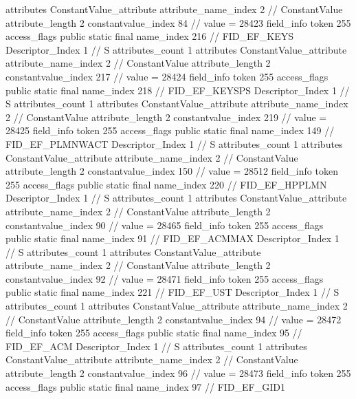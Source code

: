 {{{{{				attributes {
				ConstantValue_attribute {
					attribute_name_index	2		// ConstantValue
					attribute_length	2
					constantvalue_index	84		// value = 28423
				}
				}
			}
			field_info {
				token	255
				access_flags	public static final
				name_index	216		// FID_EF_KEYS
				Descriptor_Index	1		// S
				attributes_count	1
				attributes {
				ConstantValue_attribute {
					attribute_name_index	2		// ConstantValue
					attribute_length	2
					constantvalue_index	217		// value = 28424
				}
				}
			}
			field_info {
				token	255
				access_flags	public static final
				name_index	218		// FID_EF_KEYSPS
				Descriptor_Index	1		// S
				attributes_count	1
				attributes {
				ConstantValue_attribute {
					attribute_name_index	2		// ConstantValue
					attribute_length	2
					constantvalue_index	219		// value = 28425
				}
				}
			}
			field_info {
				token	255
				access_flags	public static final
				name_index	149		// FID_EF_PLMNWACT
				Descriptor_Index	1		// S
				attributes_count	1
				attributes {
				ConstantValue_attribute {
					attribute_name_index	2		// ConstantValue
					attribute_length	2
					constantvalue_index	150		// value = 28512
				}
				}
			}
			field_info {
				token	255
				access_flags	public static final
				name_index	220		// FID_EF_HPPLMN
				Descriptor_Index	1		// S
				attributes_count	1
				attributes {
				ConstantValue_attribute {
					attribute_name_index	2		// ConstantValue
					attribute_length	2
					constantvalue_index	90		// value = 28465
				}
				}
			}
			field_info {
				token	255
				access_flags	public static final
				name_index	91		// FID_EF_ACMMAX
				Descriptor_Index	1		// S
				attributes_count	1
				attributes {
				ConstantValue_attribute {
					attribute_name_index	2		// ConstantValue
					attribute_length	2
					constantvalue_index	92		// value = 28471
				}
				}
			}
			field_info {
				token	255
				access_flags	public static final
				name_index	221		// FID_EF_UST
				Descriptor_Index	1		// S
				attributes_count	1
				attributes {
				ConstantValue_attribute {
					attribute_name_index	2		// ConstantValue
					attribute_length	2
					constantvalue_index	94		// value = 28472
				}
				}
			}
			field_info {
				token	255
				access_flags	public static final
				name_index	95		// FID_EF_ACM
				Descriptor_Index	1		// S
				attributes_count	1
				attributes {
				ConstantValue_attribute {
					attribute_name_index	2		// ConstantValue
					attribute_length	2
					constantvalue_index	96		// value = 28473
				}
				}
			}
			field_info {
				token	255
				access_flags	public static final
				name_index	97		// FID_EF_GID1
}}}}}
